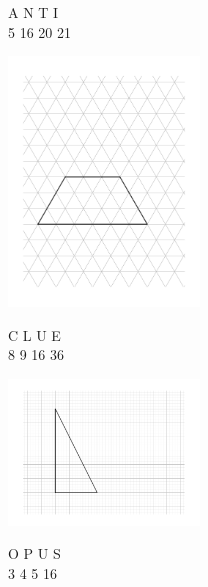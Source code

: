 \documentclass{article}
\begin{document}
\begin{flushleft}
\begin{center}
A \hspace{0.5in} N \hspace{0.5in} T \hspace{0.5in} I \\
5 \hspace{0.52in} 16 \hspace{0.52in} 20 \hspace{0.52in} 21

\end{center}

\begin{center}
\includegraphics[width=2in]{IsoTrap.pdf}

C \hspace{0.5in} L \hspace{0.5in} U \hspace{0.5in} E\\
8 \hspace{0.54in} 9 \hspace{0.54in} 16 \hspace{0.54in} 36

\end{center}

\begin{center}
\includegraphics[width=2in]{1-2RightTri.pdf}

O \hspace{0.5in} P \hspace{0.5in} U \hspace{0.5in} S\\
3 \hspace{0.54in} 4 \hspace{0.54in} 5 \hspace{0.54in} 16


\end{center}
\end{flushleft}
\end{document}

